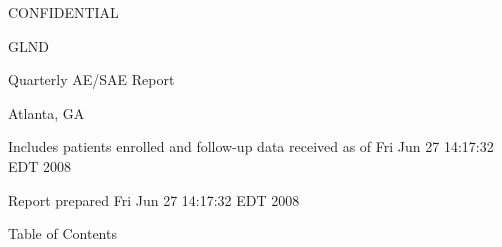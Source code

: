 \documentclass[dvips,10pt]{article}
\begin{document}
\vspace*{1in}
\begin{center}
{\Huge{CONFIDENTIAL}}
\end{center}
\vspace*{0.5in}
\begin{center}
{\Huge{GLND}}
\end{center}
\vspace*{0.25in}
\begin{center}
{\Huge{
Quarterly AE/SAE Report
}}
\end{center}
\begin{center}
{\Huge{
 
}}
\end{center}
\begin{center}
{\Huge{Atlanta, GA}}
\end{center}
\vspace*{1in}
\begin{center}
\noindent
{\Large{Includes patients enrolled and follow-up data received as of Fri Jun 27 14:17:32 EDT 2008}}
\end{center}
\vspace*{0.5in}
\begin{center}
{\Large{Report prepared  Fri Jun 27 14:17:32 EDT 2008 }}
\end{center}
\clearpage
\vspace*{1in}
\begin{center}
{\Huge{Table of Contents}}
\end{center}
\listoftables
\listoffigures
\clearpage
\end{document}
